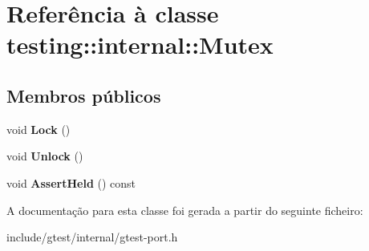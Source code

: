 \hypertarget{classtesting_1_1internal_1_1Mutex}{\section{Referência à classe testing\-:\-:internal\-:\-:Mutex}
\label{classtesting_1_1internal_1_1Mutex}
}
\subsection*{Membros públicos}
\begin{DoxyCompactItemize}
\item 
\hypertarget{classtesting_1_1internal_1_1Mutex_ae7e2191886c00182176b23c4f4d049f8}{void {\bfseries Lock} ()}\label{classtesting_1_1internal_1_1Mutex_ae7e2191886c00182176b23c4f4d049f8}

\item 
\hypertarget{classtesting_1_1internal_1_1Mutex_a315188055de1be98884519ad84eff2e6}{void {\bfseries Unlock} ()}\label{classtesting_1_1internal_1_1Mutex_a315188055de1be98884519ad84eff2e6}

\item 
\hypertarget{classtesting_1_1internal_1_1Mutex_a3a0530bca3110025d85b2aa51f3ca0d7}{void {\bfseries Assert\-Held} () const }\label{classtesting_1_1internal_1_1Mutex_a3a0530bca3110025d85b2aa51f3ca0d7}

\end{DoxyCompactItemize}


A documentação para esta classe foi gerada a partir do seguinte ficheiro\-:\begin{DoxyCompactItemize}
\item 
include/gtest/internal/gtest-\/port.\-h\end{DoxyCompactItemize}
